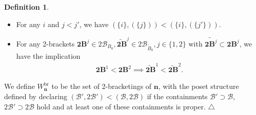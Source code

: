 \documentclass[11pt]{amsart}
\theoremstyle{definition}
\newtheorem{definition}[theorem]{Definition}
\theoremstyle{remark}
\theoremstyle{plain}
\newcommand\bn{\mathbf{n}}
\newcommand{\btB}{{\mathbf{2B}}}
\newcommand{\sB}{\mathscr{B}}
\newcommand{\stB}{2\mathscr{B}}
\newcommand{\on}{\operatorname}
\newcommand{\br}{{\on{br}}}
\newcommand{\wt}{\widetilde}
\begin{document}
\begin{definition}
\begin{itemize}
\begin{itemize}
\item For any $i$ and $j<j'$, we have $(\{i\},(\{j\})) < (\{i\},(\{j'\}))$.

\item For any 2-brackets $\btB^j \in \stB_{B_0}, \wt{\btB}^j \in \stB_{\wt B_0}, j \in \{1,2\}$ with $\wt{\btB^j}\subset \btB^j$, we have the implication
\begin{align}
\btB^1 < \btB^2 \implies \wt{\btB}^1 < \wt{\btB}^2.
\end{align}
\end{itemize}
\end{itemize}
We define $W_\bn^\br$ to be the set of 2-bracketings of $\bn$, with the poset structure defined by declaring $(\sB',\stB') < (\sB,\stB)$ if the containments
$\sB' \supset \sB$,
$\stB' \supset \stB$
hold and at least one of these containments is proper. \label{p:Wnbr}
\null\hfill$\triangle$
\end{definition}

\end{document}
